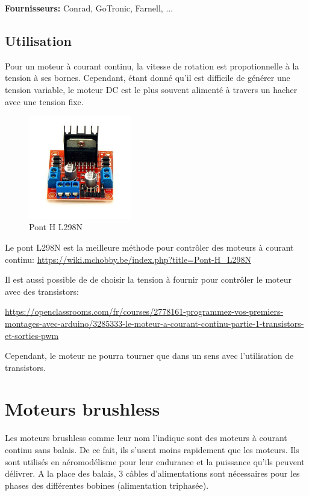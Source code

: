 \documentclass[a4paper, 11pt]{report}
\begin{document}
\textbf{Fournisseurs:} Conrad, GoTronic, Farnell, ...


\subsection{Utilisation}
Pour un moteur à courant continu, la vitesse de rotation est propotionnelle à la tension à ses bornes. Cependant, étant donné qu'il est difficile de générer une tension variable, le moteur DC est le plus souvent alimenté à travers un hacher avec une tension fixe.

\begin{figure}[h!]
\begin{centering}
\includegraphics[width=0.4\textwidth]{images/L298N.jpg}
\caption{Pont H L298N}
\par\end{centering}
\end{figure}

Le pont L298N est la meilleure méthode pour contrôler des moteurs à courant continu: \url{https://wiki.mchobby.be/index.php?title=Pont-H_L298N}


Il est aussi possible de de choisir la tension à fournir pour contrôler le moteur avec des transistors:

\url{https://openclassrooms.com/fr/courses/2778161-programmez-vos-premiers-montages-avec-arduino/3285333-le-moteur-a-courant-continu-partie-1-transistors-et-sorties-pwm}

Cependant, le moteur ne pourra tourner que dans un sens avec l'utilisation de transistors.

\section{Moteurs brushless}
Les moteurs brushless comme leur nom l'indique sont des moteurs à courant continu sans balais. De ce fait, ils s'usent moins rapidement que les moteurs. Ils sont  utilisés en aéromodélisme pour leur endurance et la puissance qu'ils peuvent délivrer. A la place des balais, 3 câbles d'alimentations sont nécessaires pour les phases des différentes bobines (alimentation triphasée).
\end{document}
